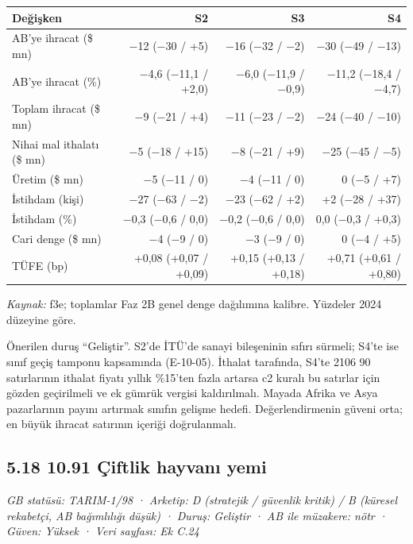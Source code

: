 \nopagebreak[4]

\begingroup\gbtablo\small

\begin{longtable}[]{@{}lrrr@{}}
\toprule\noalign{}
\textbf{Değişken} & \textbf{S2} & \textbf{S3} & \textbf{S4} \\
\midrule\noalign{}
\endhead
\bottomrule\noalign{}
\endlastfoot
AB'ye ihracat (\$ mn) & −12 (−30 / +5) & −16 (−32 / −2) & −30 (−49 / −13) \\
AB'ye ihracat (\%) & −4,6 (−11,1 / +2,0) & −6,0 (−11,9 / −0,9) & −11,2 (−18,4 / −4,7) \\
Toplam ihracat (\$ mn) & −9 (−21 / +4) & −11 (−23 / −2) & −24 (−40 / −10) \\
Nihai mal ithalatı (\$ mn) & −5 (−18 / +15) & −8 (−21 / +9) & −25 (−45 / −5) \\
Üretim (\$ mn) & −5 (−11 / 0) & −4 (−11 / 0) & 0 (−5 / +7) \\
İstihdam (kişi) & −27 (−63 / −2) & −23 (−62 / +2) & +2 (−28 / +37) \\
İstihdam (\%) & −0,3 (−0,6 / 0,0) & −0,2 (−0,6 / 0,0) & 0,0 (−0,3 / +0,3) \\
Cari denge (\$ mn) & −4 (−9 / 0) & −3 (−9 / 0) & 0 (−4 / +5) \\
TÜFE (bp) & +0,08 (+0,07 / +0,09) & +0,15 (+0,13 / +0,18) & +0,71 (+0,61 / +0,80) \\
\end{longtable}

\endgroup

\emph{Kaynak:} \etiketT{} f3e; toplamlar Faz 2B genel denge dağılımına kalibre. Yüzdeler 2024 düzeyine göre.

Önerilen duruş ``Geliştir''. S2'de İTÜ'de sanayi bileşeninin sıfırı sürmeli; S4'te ise sınıf geçiş tamponu kapsamında (E-10-05). İthalat tarafında, S4'te 2106 90 satırlarının ithalat fiyatı yıllık \%15'ten fazla artarsa c2 kuralı bu satırlar için gözden geçirilmeli ve ek gümrük vergisi kaldırılmalı. Mayada Afrika ve Asya pazarlarının payını artırmak sınıfın gelişme hedefi. Değerlendirmenin güveni orta; en büyük ihracat satırının içeriği doğrulanmalı.

\hypertarget{nace_kartlar_10-12-518-1091-uxe7iftlik-hayvanux131-yemi}{%
\subsection{5.18 10.91 Çiftlik hayvanı yemi}\label{nace_kartlar_10-12-518-1091-uxe7iftlik-hayvanux131-yemi}}

\emph{GB statüsü: TARIM-1/98 · Arketip: D (stratejik / güvenlik kritik) / B (küresel rekabetçi, AB bağımlılığı düşük) · Duruş: Geliştir · AB ile müzakere: nötr · Güven: Yüksek · Veri sayfası: Ek C.24}

